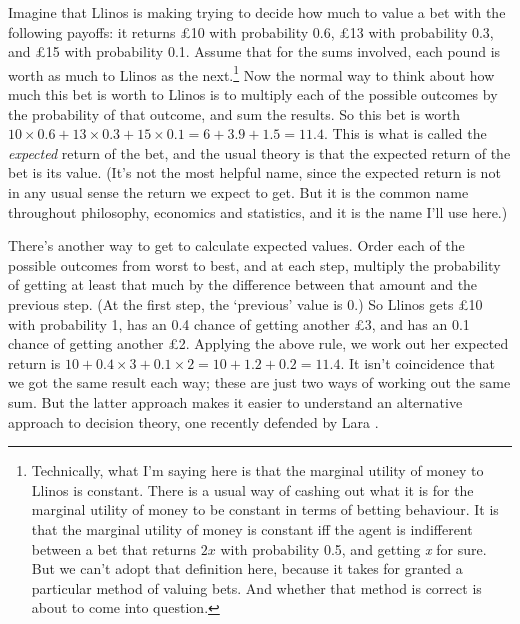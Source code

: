 Imagine that \gls{Llinos} is making trying to decide how much to value a bet with the following payoffs: it returns £10 with probability 0.6, £13 with probability 0.3, and £15 with probability 0.1. Assume that for the sums involved, each pound is worth as much to \gls{Llinos} as the next.\footnote{Technically, what I'm saying here is that the marginal utility of money to \gls{Llinos} is constant. There is a usual way of cashing out what it is for the marginal utility of money to be constant in terms of betting behaviour. It is that the marginal utility of money is constant iff the agent is indifferent between a bet that returns $2x$ with probability 0.5, and getting \emph{x} for sure. But we can't adopt that definition here, because it takes for granted a particular method of valuing bets. And whether that method is correct is about to come into question.} Now the normal way to think about how much this bet is worth to \gls{Llinos} is to multiply each of the possible outcomes by the probability of that outcome, and sum the results. So this bet is worth $10 \times 0.6 + 13 \times 0.3 + 15 \times 0.1 = 6 + 3.9 + 1.5 = 11.4$. This is what is called the \emph{expected} return of the bet, and the usual theory is that the expected return of the bet is its value. (It's not the most helpful name, since the expected return is not in any usual sense the return we expect to get. But it is the common name throughout philosophy, economics and statistics, and it is the name I'll use here.)

There's another way to get to calculate expected values. Order each of the possible outcomes from worst to best, and at each step, multiply the probability of getting at least that much by the difference between that amount and the previous step. (At the first step, the `previous' value is 0.) So \gls{Llinos} gets £10 with probability 1, has an 0.4 chance of getting another £3, and has an 0.1 chance of getting another £2. Applying the above rule, we work out her expected return is $10 + 0.4 \times 3 + 0.1 \times 2 = 10 + 1.2 + 0.2 = 11.4$. It isn't coincidence that we got the same result each way; these are just two ways of working out the same sum. But the latter approach makes it easier to understand an alternative approach to decision theory, one recently defended by Lara \citet{BuchakRisk}.

